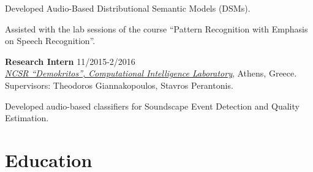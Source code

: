 \documentclass[letterpaper]{article}
\renewenvironment{itemize}{
  \begin{list}{}{
    \setlength{\leftmargin}{1.5em}
  }
}{
  \end{list}
}
\begin{document}
\begin{itemize}
    \begin{itemize}
    \item[-] 
        Developed Audio-Based Distributional Semantic Models     (DSMs).
    \item[-] 
        Assisted with the lab sessions of the course ``Pattern Recognition with Emphasis on Speech Recognition''.
    \end{itemize}
\fi
\item 
    \textbf{Research Intern} \hfill 11/2015-2/2016\\
    \href{https://www.iit.demokritos.gr/cil/}{\it NCSR ``Demokritos'', Computational Intelligence Laboratory}, Athens, Greece.\\
    Supervisors: Theodoros Giannakopoulos, Stavros Perantonis.


    \begin{itemize}
        \item[-] Developed audio-based classifiers for Soundscape Event Detection and Quality Estimation.
    \end{itemize}

\end{itemize}

\section*{Education}
\end{document}
